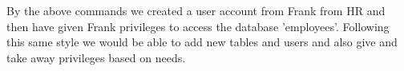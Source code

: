 \noindent By the above commands we created a user account from Frank from HR 
and then have given Frank privileges to access the database 'employees'. 
Following this same style we would be able to add new tables and users and also
 give and take away privileges based on needs.


